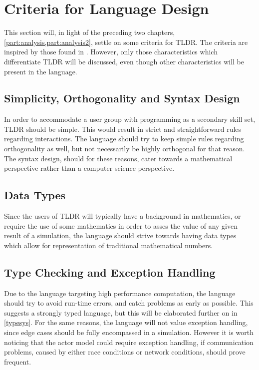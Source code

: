 \section{Criteria for Language Design}\label{analsum}

This section will, in light of the preceding two chapters, \cref{part:analysis,part:analysis2}, settle on some criteria for TLDR. The criteria are inspired by those found in \cite{sebesta2015concepts}. However, only those characteristics which differentiate TLDR will be discussed, even though other characteristics will be present in the language.


\subsection{Simplicity, Orthogonality and Syntax Design}

In order to accommodate a user group with programming as a secondary skill set, TLDR should be simple. This would result in strict and straightforward rules regarding interactions. The language should try to keep simple rules regarding orthogonality as well, but not necessarily be highly orthogonal for that reason. The syntax design, should for these reasons, cater towards a mathematical perspective rather than a computer science perspective.

\subsection{Data Types}

Since the users of TLDR will typically have a background in mathematics, or require  the use of some mathematics in order to asses the value of any given result of a simulation, the language should strive towards having data types which allow for representation of traditional mathematical numbers.


\subsection{Type Checking and Exception Handling}

Due to the language targeting high performance computation, the language should try to avoid run-time errors, and catch problems as early as possible. This suggests a strongly typed language, but this will be elaborated further on in \cref{typesys}. For the same reasons, the language will not value exception handling, since edge cases should be fully encompassed in a simulation. However it is worth noticing that the actor model could require exception handling, if communication problems, caused by either race conditions or network conditions, should prove frequent.

